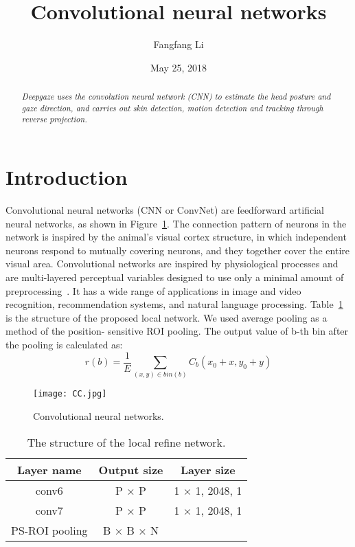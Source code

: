\documentclass{article}
\title{Convolutional neural networks}
\author{Fangfang Li}
\date{May 25, 2018}
\begin{document}
\twocolumn
\maketitle
\begin{abstract}

 \emph{Deepgaze uses the convolution neural network (CNN) to estimate the head posture and gaze direction, and carries out skin detection, motion detection and tracking through reverse projection.}
\end{abstract}
\section{Introduction}
Convolutional neural networks (CNN or ConvNet) are feedforward artificial neural networks, as shown in Figure~\ref{1}. The connection pattern of neurons in the network is inspired by the animal's visual cortex structure, in which independent neurons respond to mutually covering neurons, and they together cover the entire visual area. Convolutional networks are inspired by physiological processes and are multi-layered perceptual variables designed to use only a minimal amount of preprocessing~\cite{Lawrence1997Face}. It has a wide range of applications in image and video recognition, recommendation systems, and natural language processing. Table~\ref{table1} is the structure of the proposed local network. We used average pooling as a method of the position-
sensitive ROI pooling. The output value of b-th bin after the
pooling is calculated as:
\begin{equation}
r(b)=\frac{1}{E}\sum_{(x,y) \in bin(b)} C_b(x_0^{}+x,y_0^{}+y)
\end{equation}

\begin{figure}[!htb]
\centering
\texttt{[image: CC.jpg]}
\caption{Convolutional neural networks. }
\label{1}
\end{figure}

\begin{table}[!htb]
\caption{The structure of the local refine network. }
\label{table1}
\begin{tabular}{ccc}
\hline
Layer name 	&Output size	                   &Layer size\\
\hline
conv6             &P × P                           &1 × 1, 2048, 1\\
conv7             &P × P                            &1 × 1, 2048, 1 \\
PS-ROI pooling    &B × B × N                        & \\
\hline
\end{tabular}
\end{table}

\end{document}
